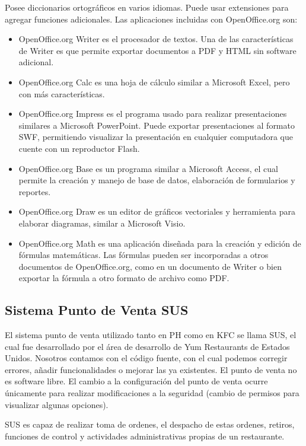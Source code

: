Posee diccionarios ortográficos en varios idiomas. Puede usar extensiones para agregar funciones adicionales. Las aplicaciones incluidas con OpenOffice.org son:

\begin{itemize}
 \item OpenOffice.org Writer es el procesador de textos. Una de las características de Writer es que permite exportar documentos a PDF y HTML sin software adicional.
 \item OpenOffice.org Calc es una hoja de cálculo similar a Microsoft Excel, pero con más características.
 \item OpenOffice.org Impress es el programa usado para realizar presentaciones similares a Microsoft PowerPoint. Puede exportar presentaciones al formato SWF, permitiendo visualizar la presentación en cualquier computadora que cuente con un reproductor Flash.
 \item OpenOffice.org Base es un programa similar a Microsoft Access, el cual permite la creación y manejo de base de datos, elaboración de formularios y reportes.
 \item OpenOffice.org Draw es un editor de gráficos vectoriales y herramienta para elaborar diagramas, similar a Microsoft Visio.
 \item OpenOffice.org Math es una aplicación diseñada para la creación y edición de fórmulas matemáticas. Las fórmulas pueden ser incorporadas a otros documentos de OpenOffice.org, como en un documento de Writer o bien exportar la fórmula a otro formato de archivo como PDF.
\end{itemize}

\subsection{Sistema Punto de Venta SUS}
\label{sec:sus}

El sistema punto de venta utilizado tanto en PH como en KFC se llama SUS, el cual fue desarrollado por el área de desarrollo de Yum Restaurants de Estados Unidos. Nosotros contamos con el código fuente, con el cual podemos corregir errores, añadir funcionalidades o mejorar las ya existentes. El punto de venta no es software libre. El cambio a la configuración del punto de venta ocurre únicamente para realizar modificaciones a la seguridad (cambio de permisos para visualizar algunas opciones).

SUS es capaz de realizar toma de ordenes, el despacho de estas ordenes, retiros, funciones de control y actividades administrativas propias de un restaurante.

